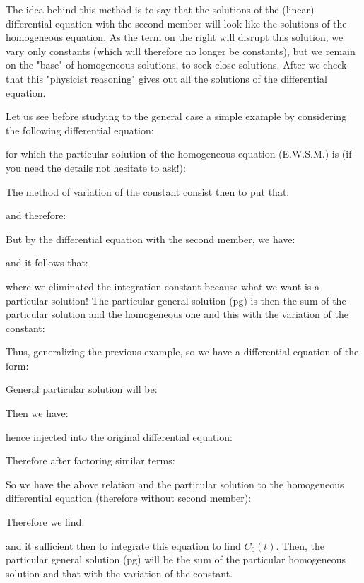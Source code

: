 	The idea behind this method is to say that the solutions of the (linear) differential equation with the second member will look like the solutions of the homogeneous equation. As the term on the right will disrupt this solution, we vary only constants (which will therefore no longer be constants), but we remain on the "base" of homogeneous solutions, to seek close solutions. After we check that this "physicist reasoning" gives out all the solutions of the differential equation.
	
	Let us see before studying to the general case a simple example by considering the following differential equation:
	
	for which the particular solution of the homogeneous equation (E.W.S.M.) is (if you need the details not hesitate to ask!):
	
	The method of variation of the constant consist then to put that:
	
	and therefore:
	
	But by the differential equation with the second member, we have:
	
	
	and it follows that:
	
	where we eliminated the integration constant because what we want is a particular solution! The particular general solution (pg) is then the sum of the particular solution and the homogeneous one and this with the variation of the constant:
	
	Thus, generalizing the previous example, so we have a differential equation of the form:
	
	General particular solution will be:
	
	Then we have:
	
	hence injected into the original differential equation:
	
	Therefore after factoring similar terms:
	
	So we have the above relation and the particular solution to the homogeneous differential equation (therefore without second member):
	
	Therefore we find:
	
	and it sufficient then to integrate this equation to find $C_0(t)$. Then, the particular general solution (pg) will be the sum of the particular homogeneous solution and that with the variation of the constant.
	
	\pagebreak
